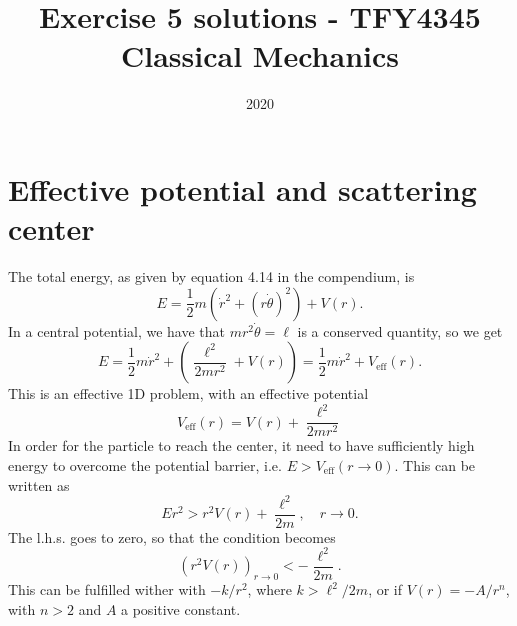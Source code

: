 \documentclass{article}
\title{Exercise 5 solutions - TFY4345 Classical Mechanics}
\date{2020}
\begin{document}
    \maketitle
    \section{Effective potential and scattering center}
        The total energy, as given by equation 4.14 in the compendium, is
        \begin{equation*}
            E = \frac{1}{2}m\left( \dot r^2 + (r\dot \theta)^2 \right) + V(r).
        \end{equation*}
        In a central potential, we have that $mr^2 \dot \theta = \ell$  is a conserved quantity, so we get 
        \begin{equation*}
            E = \frac{1}{2} m \dot r^2 + \left(\frac{\ell^2}{2 m r^2} + V(r) \right) = \frac{1}{2}m \dot r^2 + V_{\mathrm{eff}}(r).
        \end{equation*}
        This is an effective 1D problem, with an effective potential 
        \begin{equation*}
            V_{\mathrm{eff}}(r) = V(r) + \frac{\ell^2}{2 m r^2}
        \end{equation*}
        In order for the particle to reach the center, it need to have sufficiently high energy to overcome the potential barrier, i.e. $E > V_{\mathrm{eff}}(r \rightarrow 0)$. This can be written as
        \begin{equation*}
            E r^2 > r^2 V(r) + \frac{\ell^2}{2 m}, \quad r \rightarrow 0.
        \end{equation*}
        The l.h.s. goes to zero, so that the condition becomes 
        \begin{equation*}
            (r^2V(r))_{r \rightarrow 0} < - \frac{\ell^2}{2m}.
        \end{equation*}
        This can be fulfilled wither with $- k / r^2$, where $k > \ell^2 / 2m$, or if $V(r) = - A/r^n$, with $n > 2$ and $A$ a positive constant.
\end{document}
